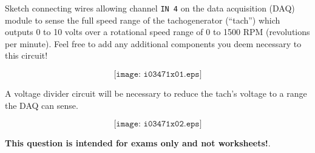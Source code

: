

Sketch connecting wires allowing channel {\tt IN 4} on the data acquisition (DAQ) module to sense the full speed range of the tachogenerator (``tach'') which outputs 0 to 10 volts over a rotational speed range of 0 to 1500 RPM (revolutions per minute).  Feel free to add any additional components you deem necessary to this circuit!

\vskip 50pt

$$\texttt{[image: i03471x01.eps]}$$







A voltage divider circuit will be necessary to reduce the tach's voltage to a range the DAQ can sense.

$$\texttt{[image: i03471x02.eps]}$$







{\bf This question is intended for exams only and not worksheets!}.


